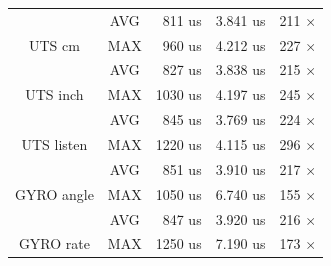 \begin{table}[]
\begin{tabular}{@{}ccrrr@{}}
\multicolumn{1}{|c}{}                                & \cellcolor[HTML]{EFEFEF}AVG & \cellcolor[HTML]{EFEFEF}    811 us & \cellcolor[HTML]{EFEFEF}    3.841 us & \multicolumn{1}{r|}{\cellcolor[HTML]{EFEFEF}    211 $\times$}  \\
\multicolumn{1}{|c}{\multirow{-2}{*}{UTS cm}}        & \cellcolor[HTML]{FFFFFF}MAX & \cellcolor[HTML]{FFFFFF}    960 us & \cellcolor[HTML]{FFFFFF}    4.212 us & \multicolumn{1}{r|}{\cellcolor[HTML]{FFFFFF}    227 $\times$}  \\ \midrule
\multicolumn{1}{|c}{}                                & \cellcolor[HTML]{EFEFEF}AVG & \cellcolor[HTML]{EFEFEF}    827 us & \cellcolor[HTML]{EFEFEF}    3.838 us & \multicolumn{1}{r|}{\cellcolor[HTML]{EFEFEF}    215 $\times$}  \\
\multicolumn{1}{|c}{\multirow{-2}{*}{UTS inch}}      & \cellcolor[HTML]{FFFFFF}MAX & \cellcolor[HTML]{FFFFFF}   1030 us & \cellcolor[HTML]{FFFFFF}    4.197 us & \multicolumn{1}{r|}{\cellcolor[HTML]{FFFFFF}    245 $\times$}  \\ \midrule
\multicolumn{1}{|c}{}                                & \cellcolor[HTML]{EFEFEF}AVG & \cellcolor[HTML]{EFEFEF}    845 us & \cellcolor[HTML]{EFEFEF}    3.769 us & \multicolumn{1}{r|}{\cellcolor[HTML]{EFEFEF}    224 $\times$}  \\
\multicolumn{1}{|c}{\multirow{-2}{*}{UTS listen}}    & \cellcolor[HTML]{FFFFFF}MAX & \cellcolor[HTML]{FFFFFF}   1220 us & \cellcolor[HTML]{FFFFFF}    4.115 us & \multicolumn{1}{r|}{\cellcolor[HTML]{FFFFFF}    296 $\times$}  \\ \midrule
\multicolumn{1}{|c}{}                                & \cellcolor[HTML]{EFEFEF}AVG & \cellcolor[HTML]{EFEFEF}    851 us & \cellcolor[HTML]{EFEFEF}    3.910 us & \multicolumn{1}{r|}{\cellcolor[HTML]{EFEFEF}    217 $\times$}  \\
\multicolumn{1}{|c}{\multirow{-2}{*}{GYRO angle}}    & \cellcolor[HTML]{FFFFFF}MAX & \cellcolor[HTML]{FFFFFF}   1050 us & \cellcolor[HTML]{FFFFFF}    6.740 us & \multicolumn{1}{r|}{\cellcolor[HTML]{FFFFFF}    155 $\times$}  \\ \midrule
\multicolumn{1}{|c}{}                                & \cellcolor[HTML]{EFEFEF}AVG & \cellcolor[HTML]{EFEFEF}    847 us & \cellcolor[HTML]{EFEFEF}    3.920 us & \multicolumn{1}{r|}{\cellcolor[HTML]{EFEFEF}    216 $\times$}  \\
\multicolumn{1}{|c}{\multirow{-2}{*}{GYRO rate}}     & \cellcolor[HTML]{FFFFFF}MAX & \cellcolor[HTML]{FFFFFF}   1250 us & \cellcolor[HTML]{FFFFFF}    7.190 us & \multicolumn{1}{r|}{\cellcolor[HTML]{FFFFFF}    173 $\times$}  \\ \midrule

\end{tabular}
\end{table}
